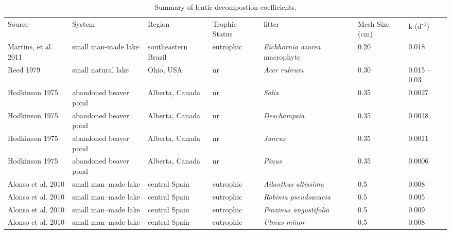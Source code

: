 \begin{table}
\label{tab:k_summary}
\begin{tabular}{ l l l l l l l }
Source               & System                & Region              & Trophic Status & litter & Mesh Size (cm) & k (d\textsuperscript{-1}) \\
Martins, et al. 2011 & small man-made lake   & southeastern Brazil & eutrophic      & \emph{Eichhornia azurea} macrophyte & 0.20 & 0.018 \\
Reed 1979            & small natural lake    & Ohio, USA           & nr             & \emph{Acer rubrum} & 0.30 & 0.015 -- 0.03 \\
Hodkinson 1975       & abandoned beaver pond & Alberta, Canada     & nr             & \emph{Salix} & 0.35 & 0.0027 \\
Hodkinson 1975       & abandoned beaver pond & Alberta, Canada     & nr             & \emph{Deschampsia} & 0.35 & 0.0018 \\
Hodkinson 1975       & abandoned beaver pond & Alberta, Canada     & nr             & \emph{Juncus} & 0.35 & 0.0011 \\
Hodkinson 1975       & abandoned beaver pond & Alberta, Canada     & nr             & \emph{Pinus} & 0.35 & 0.0006 \\
Alonso et al. 2010   & small man--made lake  & central Spain       & eutrophic      & \emph{Ailanthus
altissima} & 0.5 & 0.008 \\ 
Alonso et al. 2010   & small man--made lake  & central Spain       & eutrophic      & \emph{Robinia pseudoacacia} & 0.5 & 0.005 \\
Alonso et al. 2010   & small man--made lake  & central Spain       & eutrophic      & \emph{Fraxinus angustifolia} & 0.5 & 0.009 \\
Alonso et al. 2010   & small man--made lake  & central Spain       & eutrophic      & \emph{Ulmus minor } & 0.5 & 0.008 \\






\end{tabular}
\caption{Summary of lentic decompostion coefficients.}
\end{table}